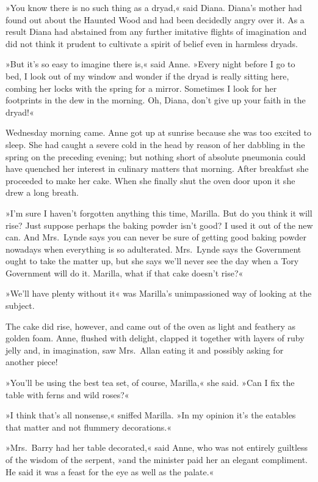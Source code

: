 »You know there is no such thing as a dryad,« said Diana. Diana's mother had found out about the Haunted Wood and had been decidedly angry over it. As a result Diana had abstained from any further imitative flights of imagination and did not think it prudent to cultivate a spirit of belief even in harmless dryads.

»But it's so easy to imagine there is,« said Anne. »Every night before I go to bed, I look out of my window and wonder if the dryad is really sitting here, combing her locks with the spring for a mirror. Sometimes I look for her footprints in the dew in the morning. Oh, Diana, don't give up your faith in the dryad!«

Wednesday morning came. Anne got up at sunrise because she was too excited to sleep. She had caught a severe cold in the head by reason of her dabbling in the spring on the preceding evening; but nothing short of absolute pneumonia could have quenched her interest in culinary matters that morning. After breakfast she proceeded to make her cake. When she finally shut the oven door upon it she drew a long breath.

»I'm sure I haven't forgotten anything this time, Marilla. But do you think it will rise? Just suppose perhaps the baking powder isn't good? I used it out of the new can. And Mrs.~Lynde says you can never be sure of getting good baking powder nowadays when everything is so adulterated. Mrs.~Lynde says the Government ought to take the matter up, but she says we'll never see the day when a Tory Government will do it. Marilla, what if that cake doesn't rise?«

»We'll have plenty without it« was Marilla's unimpassioned way of looking at the subject.

The cake did rise, however, and came out of the oven as light and feathery as golden foam. Anne, flushed with delight, clapped it together with layers of ruby jelly and, in imagination, saw Mrs.~Allan eating it and possibly asking for another piece!

»You'll be using the best tea set, of course, Marilla,« she said. »Can I fix the table with ferns and wild roses?«

»I think that's all nonsense,« sniffed Marilla. »In my opinion it's the eatables that matter and not flummery decorations.«

»Mrs.~Barry had her table decorated,« said Anne, who was not entirely guiltless of the wisdom of the serpent, »and the minister paid her an elegant compliment. He said it was a feast for the eye as well as the palate.«

